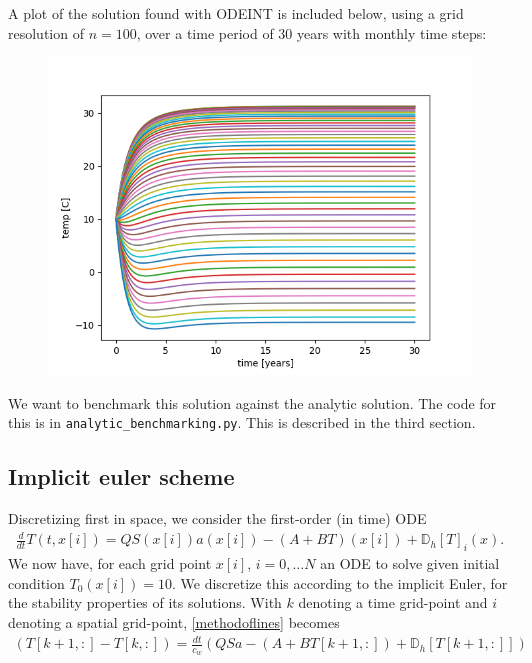 \documentclass{article}
\theoremstyle{remark}
\begin{document}
A plot of the solution found with ODEINT is included below, using a grid resolution of 
$n = 100$, over a time period of 30 years with monthly time steps:

\begin{figure}
\centering
\includegraphics{odeint_profile.png}
\end{figure}

We want to benchmark this solution against the analytic solution. The code for this is in
\verb+analytic_benchmarking.py+. This is described in the third section.



\subsection{Implicit euler scheme}

Discretizing first in space, we consider the first-order (in time) ODE 
\begin{align}\label{methodoflines}
	\frac{d}{dt} T(t,x[i]) = QS(x[i])a(x[i]) - (A+BT)(x[i]) + \mathbb{D}_h[T]_i(x).
\end{align}
We now have, for each grid point $x[i]$, $i = 0, \ldots N$ an ODE to solve given
initial condition $T_0(x[i]) = 10$. We discretize this according to the implicit
Euler, for the stability properties of its solutions. With $k$ denoting a time
grid-point and $i$ denoting a spatial grid-point, \eqref{methodoflines}
becomes
\begin{align}\label{fully_discretized}
	(T[k+1,:] - T[k,:] ) = \frac{dt}{c_w} \left( QSa - (A+BT[k+1,:]) + \mathbb{D}_h[T[k+1,:]] \right)
\end{align}
\end{document}
